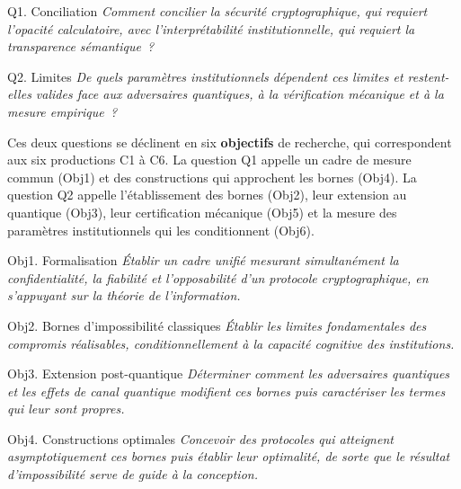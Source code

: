 \begin{sloppypar}
\medskip
\begin{boiteQuestion}{Q1. Conciliation}
\textit{Comment concilier la s\'ecurit\'e cryptographique, qui requiert l'opacit\'e calculatoire, avec l'interpr\'etabilit\'e institutionnelle, qui requiert la transparence s\'emantique~?}
\end{boiteQuestion}

\medskip
\begin{boiteQuestion}{Q2. Limites}
\textit{De quels param\`etres institutionnels d\'ependent ces limites et restent-elles valides face aux adversaires quantiques, \`a la v\'erification m\'ecanique et \`a la mesure empirique~?}
\end{boiteQuestion}

Ces deux questions se d\'eclinent en six \textbf{objectifs} de recherche, qui correspondent aux six productions C1 \`a C6. La question Q1 appelle un cadre de mesure commun (Obj1) et des constructions qui approchent les bornes (Obj4). La question Q2 appelle l'\'etablissement des bornes (Obj2), leur extension au quantique (Obj3), leur certification m\'ecanique (Obj5) et la mesure des param\`etres institutionnels qui les conditionnent (Obj6).

\medskip
\begin{boiteQuestion}{Obj1. Formalisation}
\textit{\'Etablir un cadre unifi\'e mesurant simultan\'ement la confidentialit\'e, la fiabilit\'e et l'opposabilit\'e d'un protocole cryptographique, en s'appuyant sur la th\'eorie de l'information.}
\end{boiteQuestion}

\medskip
\begin{boiteQuestion}{Obj2. Bornes d'impossibilit\'e classiques}
\textit{\'Etablir les limites fondamentales des compromis r\'ealisables, conditionnellement \`a la capacit\'e cognitive des institutions.}
\end{boiteQuestion}

\medskip
\begin{boiteQuestion}{Obj3. Extension post-quantique}
\textit{D\'eterminer comment les adversaires quantiques et les effets de canal quantique modifient ces bornes puis caract\'eriser les termes qui leur sont propres.}
\end{boiteQuestion}

\medskip
\begin{boiteQuestion}{Obj4. Constructions optimales}
\textit{Concevoir des protocoles qui atteignent asymptotiquement ces bornes puis \'etablir leur optimalit\'e, de sorte que le r\'esultat d'impossibilit\'e serve de guide \`a la conception.}
\end{boiteQuestion}


\end{sloppypar}
